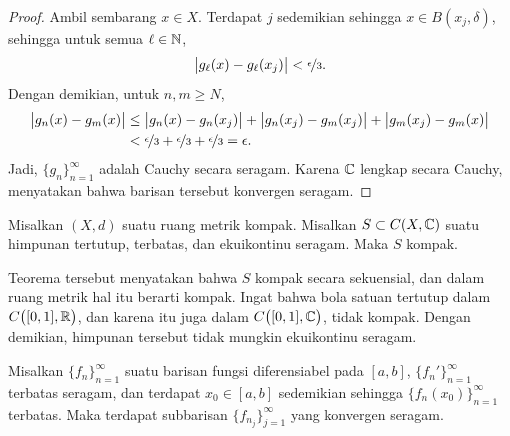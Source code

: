 \begin{proof}
Ambil sembarang $x \in X$.  Terdapat $j$ sedemikian sehingga
$x \in B(x_j,\delta)$, sehingga untuk semua $\ell \in {\mathbb{N}}$,
\begin{equation*}
\bigl\lvert {g_\ell(x)-g_\ell(x_j)} \bigr\rvert < \nicefrac{\epsilon}{3}.
\end{equation*}
Dengan demikian, untuk $n,m \geq N$,
\begin{equation*}
\begin{split}
\bigl\lvert {g_n(x)-g_m(x)} \bigr\rvert & \leq
\bigl\lvert {g_n(x)-g_n(x_j)} \bigr\rvert +
\bigl\lvert {g_n(x_j)-g_m(x_j)} \bigr\rvert +
\bigl\lvert {g_m(x_j)-g_m(x)} \bigr\rvert
\\
& <
\nicefrac{\epsilon}{3} +
\nicefrac{\epsilon}{3} +
\nicefrac{\epsilon}{3} = \epsilon .
\end{split}
\end{equation*}
Jadi, $\{ g_n \}_{n=1}^\infty$ adalah Cauchy secara seragam.  Karena ${\mathbb{C}}$
lengkap secara Cauchy,  menyatakan bahwa barisan tersebut konvergen seragam.
\end{proof}

\begin{cor}
Misalkan $(X,d)$ suatu ruang metrik kompak.
Misalkan $S \subset C(X,{\mathbb{C}})$ suatu himpunan tertutup, terbatas, dan ekuikontinu seragam.
Maka $S$ kompak.
\end{cor}

Teorema tersebut menyatakan bahwa $S$
kompak secara sekuensial, dan dalam ruang metrik hal itu berarti
kompak.
Ingat bahwa bola satuan tertutup dalam $C\bigl([0,1],{\mathbb{R}}\bigr)$, dan karena itu juga dalam
$C\bigl([0,1],{\mathbb{C}}\bigr)$, tidak kompak.
Dengan demikian, himpunan tersebut tidak mungkin ekuikontinu seragam.

\begin{cor}
Misalkan $\{ f_n \}_{n=1}^\infty$ suatu barisan fungsi diferensiabel pada $[a,b]$,
$\{ f_n' \}_{n=1}^\infty$ terbatas seragam, dan terdapat
$x_0 \in [a,b]$ sedemikian sehingga $\{ f_n(x_0) \}_{n=1}^\infty$ terbatas.
Maka terdapat subbarisan
$\{ f_{n_j} \}_{j=1}^\infty$ yang konvergen seragam.
\end{cor}

